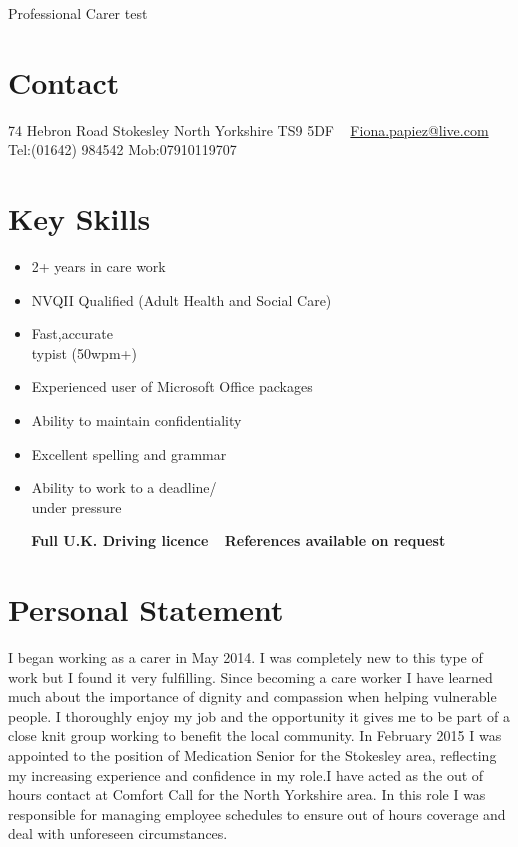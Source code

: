 \documentclass[]{friggeri-cv}
\begin{document}
       {Professional Carer}
       {test}


\begin{aside}
  \section{Contact}
    74 Hebron Road
    Stokesley
    North Yorkshire
    TS9 5DF
    ~
    \href{mailto:Fiona.papiez@live.com}{Fiona.papiez@live.com}
    ~
    Tel:(01642) 984542
    Mob:07910119707
    ~
  \section{Key Skills}
   \begin{itemize}
   \item 2+ years in care work
   \item NVQII Qualified (Adult Health and Social Care)
   \item Fast,accurate \\ typist (50wpm+)
   \item Experienced user of Microsoft Office packages
   \item Ability to maintain confidentiality
   \item Excellent spelling and grammar
   \item Ability to work to a deadline/ \\ under pressure
   \end{itemize}
   ~
   ~
   \textbf{Full U.K. Driving licence}
   ~
   \textbf{References available on request}
\end{aside}

\section{Personal Statement}

I began working as a carer in May 2014. I was completely new to this type of work but I found it very fulfilling. Since becoming a care worker I have learned much about the importance of dignity and compassion when helping vulnerable people. I thoroughly enjoy my job and the opportunity it gives me to be part of a close knit group working to benefit the local community.  In February 2015 I was appointed to the position of Medication Senior for the Stokesley area, reflecting my increasing experience and confidence in my role.I have acted as the out of hours contact at Comfort Call for the North Yorkshire area. In this role I was responsible for managing employee schedules to ensure out of hours coverage and deal with unforeseen circumstances.   
\end{document}
